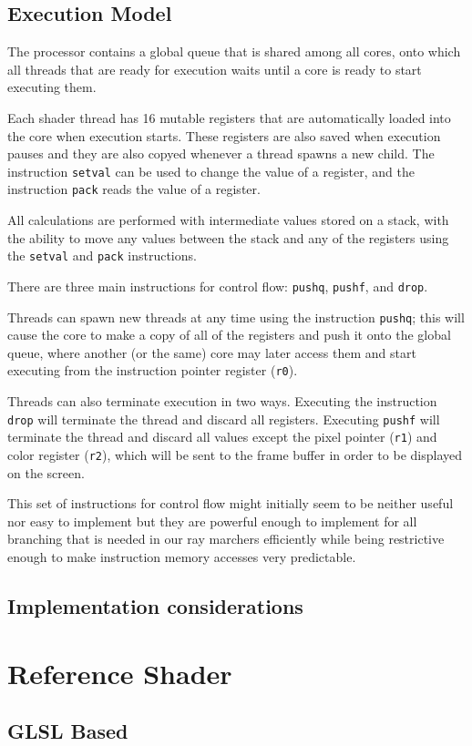 		\subsection{Execution Model}

			The processor contains a global queue that is shared among all
			cores, onto which all threads that are ready for execution waits
			until a core is ready to start executing them.
			
			Each shader thread has 16 mutable registers that are automatically
			loaded into the core when execution starts. These registers are
			also saved when execution pauses and they are also copyed whenever
			a thread spawns a new child. The instruction \texttt{setval} can be
			used to change the value of a register, and the instruction
			\texttt{pack} reads the value of a register.
	
			All calculations are performed with intermediate values stored on a
			stack, with the ability to move any values between the stack and
			any of the registers using the \texttt{setval} and \texttt{pack}
			instructions.
	
			There are three main instructions for control flow: \texttt{pushq},
			\texttt{pushf}, and \texttt{drop}. 
			
			Threads can spawn new threads at any time using the instruction
			\texttt{pushq}; this will cause the core to make a copy of all of
			the registers and push it onto the global queue, where another (or
			the same) core may later access them and start executing from the
			instruction pointer register (\texttt{r0}).
			
			Threads can also terminate execution in two ways. Executing the
			instruction \texttt{drop} will terminate the thread and discard all
			registers. Executing \texttt{pushf} will terminate the thread and
			discard all values except the pixel pointer (\texttt{r1}) and color
			register (\texttt{r2}), which will be sent to the frame buffer in
			order to be displayed on the screen.
	
			This set of instructions for control flow might initially seem to
			be neither useful nor easy to implement but they are powerful
			enough to implement for all branching that is needed in our ray
			marchers efficiently while being restrictive enough to make
			instruction memory accesses very predictable.
		
		\subsection{Implementation considerations}
	
	\section{Reference Shader} \label{implshader}
	
		\subsection{GLSL Based}
	
		\subsection{}
